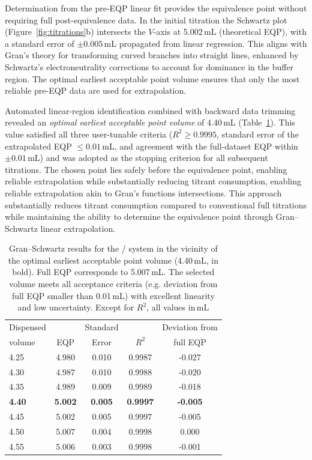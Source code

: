\documentclass[twoside,twocolumn,9pt]{article}
\begin{document}
{Determination from the pre-EQP linear fit provides the equivalence point without requiring full post-equivalence data. In the initial titration the Schwartz plot (Figure~\ref{fig:titrations}b) intersects the $V$-axis at 5.002\,mL (theoretical EQP), with a standard error of $\pm 0.005$\,mL propagated from linear regression. This aligns with Gran's theory for transforming curved branches into straight lines, enhanced by Schwartz's electroneutrality corrections to account for \ce{[H+]} dominance in the buffer region. The optimal earliest acceptable point volume ensures that only the most reliable pre-EQP data are used for extrapolation.

Automated linear-region identification combined with backward data trimming revealed an \emph{optimal earliest acceptable point volume} of 4.40\,mL (Table~\ref{tab:trimming}). This value satisfied all three user-tunable criteria ($R^2 \ge 0.9995$, standard error of the extrapolated EQP $\le 0.01$\,mL, and agreement with the full-dataset EQP within $\pm 0.01$\,mL) and was adopted as the stopping criterion for all subsequent titrations. The chosen point lies safely before the equivalence point, enabling reliable extrapolation while substantially reducing titrant consumption, enabling reliable extrapolation akin to Gran's functions intersections. This approach substantially reduces titrant consumption compared to conventional full titrations while maintaining the ability to determine the equivalence point through Gran--Schwartz linear extrapolation.

\begin{table}[h]
\small
  \caption{Gran--Schwartz results for the / system in the vicinity of the optimal earliest acceptable point volume (4.40\,mL, in bold). Full EQP corresponds to 5.007\,mL. The selected volume meets all acceptance criteria (e.g. deviation from full EQP smaller than 0.01\,mL) with excellent linearity and low uncertainty. Except for $R^2$, all values in\,mL}
  \label{tab:trimming}
  \begin{tabular*}{0.48\textwidth}{@{\extracolsep{\fill}}lcccc}
    \hline
    Dispensed &     & Standard &       & Deviation from \\
    volume    & EQP & Error    & $R^2$ & full EQP       \\
    \hline
    4.25 & 4.980 & 0.010 & 0.9987 & -0.027 \\
    4.30 & 4.987 & 0.010 & 0.9988 & -0.020 \\
    4.35 & 4.989 & 0.009 & 0.9989 & -0.018 \\
    \textbf{4.40} & \textbf{5.002} & \textbf{0.005} & \textbf{0.9997} & \textbf{-0.005} \\
    4.45 & 5.002 & 0.005 & 0.9997 & -0.005 \\
    4.50 & 5.007 & 0.004 & 0.9998 & \phantom{-}0.000 \\
    4.55 & 5.006 & 0.003 & 0.9998 & -0.001 \\
    \hline
  \end{tabular*}
\end{table}

}
\end{document}
